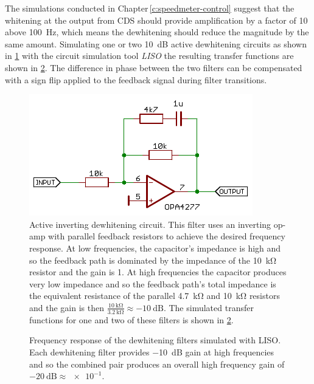 The simulations conducted in Chapter\,\ref{c:speedmeter-control} suggest that the whitening at the output from \gls{CDS} should provide amplification by a factor of \num{10} above \SI{100}{\hertz}, which means the dewhitening should reduce the magnitude by the same amount. Simulating one or two \SI{10}{\deci\bel} active dewhitening circuits as shown in \cref{fig:hv-amp-dewhitening-circuit} with the circuit simulation tool \emph{\gls{LISO}} the resulting transfer functions are shown in \cref{fig:hv-amp-dewhitening-sims}. The difference in phase between the two filters can be compensated with a sign flip applied to the feedback signal during filter transitions.

\begin{figure}
  \centering
  \includegraphics[width=0.6\columnwidth]{graphics/60-hv-amp-dewhitening.pdf}
  \caption[Active inverting dewhitening circuit]{Active inverting dewhitening circuit. This filter uses an inverting op-amp with parallel feedback resistors to achieve the desired frequency response. At low frequencies, the capacitor's impedance is high and so the feedback path is dominated by the impedance of the \SI{10}{\kilo\ohm} resistor and the gain is \num{1}. At high frequencies the capacitor produces very low impedance and so the feedback path's total impedance is the equivalent resistance of the parallel \SI{4.7}{\kilo\ohm} and \SI{10}{\kilo\ohm} resistors and the gain is then $\frac{\SI{10}{\kilo\ohm}}{\SI{3.2}{\kilo\ohm}} \approx \SI{-10}{\deci\bel}$. The simulated transfer functions for one and two of these filters is shown in \cref{fig:hv-amp-dewhitening-sims}.}
  \label{fig:hv-amp-dewhitening-circuit}
\end{figure}

\begin{figure}
  \centering
  
  \caption[Simulated dewhitening filter frequency response]{Frequency response of the dewhitening filters simulated with \gls{LISO}. Each dewhitening filter provides \SI{-10}{\deci\bel} gain at high frequencies and so the combined pair produces an overall high frequency gain of $\SI{-20}{\deci\bel} \approx \num{e-1}$.}
  \label{fig:hv-amp-dewhitening-sims}
\end{figure}

